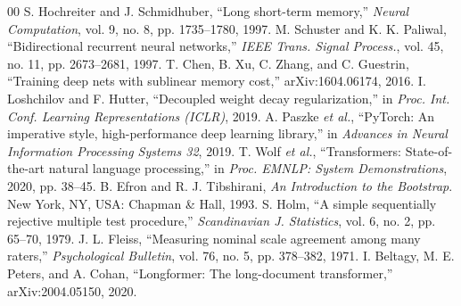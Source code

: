 \documentclass[conference]{IEEEtran}
\begin{document}
\begin{thebibliography}{00}
 S. Hochreiter and J. Schmidhuber, ``Long short-term memory,'' \textit{Neural Computation}, vol. 9, no. 8, pp. 1735--1780, 1997.
 M. Schuster and K. K. Paliwal, ``Bidirectional recurrent neural networks,'' \textit{IEEE Trans. Signal Process.}, vol. 45, no. 11, pp. 2673--2681, 1997.
 T. Chen, B. Xu, C. Zhang, and C. Guestrin, ``Training deep nets with sublinear memory cost,'' arXiv:1604.06174, 2016.
 I. Loshchilov and F. Hutter, ``Decoupled weight decay regularization,'' in \textit{Proc. Int. Conf. Learning Representations (ICLR)}, 2019.
 A. Paszke \textit{et al.}, ``PyTorch: An imperative style, high-performance deep learning library,'' in \textit{Advances in Neural Information Processing Systems 32}, 2019.
 T. Wolf \textit{et al.}, ``Transformers: State-of-the-art natural language processing,'' in \textit{Proc. EMNLP: System Demonstrations}, 2020, pp. 38--45.
 B. Efron and R. J. Tibshirani, \textit{An Introduction to the Bootstrap}. New York, NY, USA: Chapman \& Hall, 1993.
 S. Holm, ``A simple sequentially rejective multiple test procedure,'' \textit{Scandinavian J. Statistics}, vol. 6, no. 2, pp. 65--70, 1979.
 J. L. Fleiss, ``Measuring nominal scale agreement among many raters,'' \textit{Psychological Bulletin}, vol. 76, no. 5, pp. 378--382, 1971.
 I. Beltagy, M. E. Peters, and A. Cohan, ``Longformer: The long-document transformer,'' arXiv:2004.05150, 2020.
\end{thebibliography}
\end{document}
